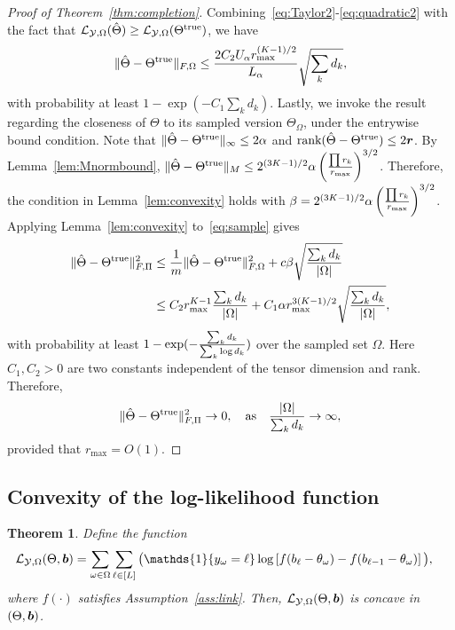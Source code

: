 \documentclass{article}
\theoremstyle{plain}
\newtheorem{thm}{Theorem}[section]
\theoremstyle{definition}
\begin{document}
\begin{proof}[Proof of Theorem~\ref{thm:completion}]
Combining~\eqref{eq:Taylor2}-\eqref{eq:quadratic2} with the fact that $\mathcal{L}_{\mathcal{Y},\Omega}(\hat \Theta)\geq \mathcal{L}_{\mathcal{Y},\Omega}(\Theta^{\mathrm{true}})$, we have
\begin{equation}\label{eq:sample}
\lVert\hat \Theta-\Theta^{\mathrm{true}}\rVert_{F,\Omega}\leq {2C_2U_\alpha  r_{\max}^{(K-1)/2} \over L_\alpha} \sqrt{\sum_kd_k},
\end{equation}
with probability at least $1-\exp(-C_1 \sum_k d_k)$. Lastly, we invoke the result regarding the closeness of $\Theta$ to its sampled version $\Theta_{\Omega}$, under the entrywise bound condition. Note that $\lVert\hat\Theta-\Theta^{\mathrm{true}}\rVert_\infty\leq 2\alpha$ and $\text{rank}(\hat \Theta-\Theta^{\mathrm{true}})\leq 2\bm{r}$. By Lemma~\ref{lem:Mnormbound}, $\lVert\hat \Theta-\Theta^{\mathrm{true}}\rVert_M\leq 2^{(3K-1)/2} \alpha \left({\prod r_k \over r_{\max}}\right)^{3/2}$. Therefore, the condition in Lemma~\ref{lem:convexity} holds with $\beta=2^{(3K-1)/2}\alpha \left({\prod r_k \over r_{\max}}\right)^{3/2}$.
Applying Lemma~\ref{lem:convexity} to~\eqref{eq:sample} gives
\begin{align}
 \lVert\hat \Theta-\Theta^{\mathrm{true}}\rVert_{F,\Pi}^2&\leq {1\over m}\lVert\hat \Theta-\Theta^{\mathrm{true}}\rVert_{F,\Omega}^2+c\beta\sqrt{\sum_k d_k\over |\Omega|}\\
 &\leq {C_2  r^{K-1}_{\max}} {\sum_k d_k \over |\Omega|}+C_1 \alpha r_{\max}^{3(K-1)/2}\sqrt{\sum_kd_k\over |\Omega|},
\end{align}
with probability at least $1-\exp(-{\sum_kd_k\over \sum_k \log d_k})$ over the sampled set $\Omega$. Here $C_1, C_2>0$ are two constants independent of the tensor dimension and rank. Therefore,
\[
 \lVert\hat \Theta-\Theta^{\mathrm{true}}\rVert_{F,\Pi}^2\to 0,\quad \text{as}\quad {|\Omega|\over \sum_kd_k}\to \infty,
\]
provided that $r_{\max}=O(1)$.
\end{proof}

\subsection{Convexity of the log-likelihood function}\label{sec:proofconvexity}
\begin{thm}\label{thm:convexity}
Define the function
\begin{align}\label{eq:function}
 \logl(\Theta, \mb)&=\sum_{\omega\in\Omega}\sum_{\ell\in[L]} \big(\mathds{1}\{y_\omega=\ell\}\log \left[f(b_\ell-\theta_\omega)-  f(b_{\ell-1}-\theta_\omega)\right]\big),
 \end{align}
where $f(\cdot)$ satisfies Assumption~\ref{ass:link}. Then, $\mathcal{L}_{\mathcal{Y},\Omega}(\Theta, \bm{b})$ is concave in $(\Theta,\bm{b})$.
\end{thm}
\end{document}
